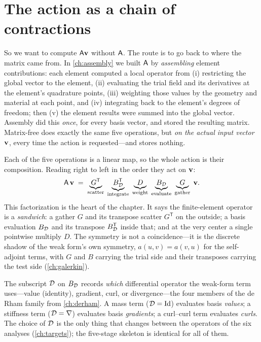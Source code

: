 \section{The action as a chain of contractions}
\label{sec:mf-chain}

So we want to compute $\mathsf{A}\mathbf{v}$ without $\mathsf{A}$. The route is to go back to
where the matrix came from. In \cref{ch:assembly} we built $\mathsf{A}$ by
\emph{assembling} element contributions: each element computed a local operator
from (i) restricting the global vector to the element, (ii) evaluating the
trial field and its derivatives at the element's quadrature points, (iii)
weighting those values by the geometry and material at each point, and (iv)
integrating back to the element's degrees of freedom; then (v) the element
results were summed into the global vector. Assembly did this \emph{once}, for
every basis vector, and stored the resulting matrix. Matrix-free does exactly the
same five operations, but \emph{on the actual input vector $\mathbf{v}$}, every time the
action is requested---and stores nothing.

Each of the five operations is a linear map, so the whole action is their
composition. Reading right to left in the order they act on $\mathbf{v}$:
\begin{equation}
  \mathsf{A}\,\mathbf{v}
   \;=\;
   \underbrace{G^{\mathsf T}}_{\text{scatter}}\;
   \underbrace{B_{\mathcal{D}}^{\mathsf T}}_{\text{integrate}}\;
   \underbrace{D}_{\text{weight}}\;
   \underbrace{B_{\mathcal{D}}}_{\text{evaluate}}\;
   \underbrace{G}_{\text{gather}}\;
   \mathbf{v} .
  \label{eq:mf-chain}
\end{equation}
This factorization is the heart of the chapter. It says the finite-element
operator is a \emph{sandwich}: a gather $G$ and its transpose scatter
$G^{\mathsf T}$ on the outside; a basis evaluation $B_{\mathcal{D}}$ and its transpose
$B_{\mathcal{D}}^{\mathsf T}$ inside that; and at the very center a single pointwise
multiply $D$. The symmetry is not a coincidence---it is the discrete shadow of
the weak form's own symmetry, $a(u,v)=a(v,u)$ for the self-adjoint terms, with
$G$ and $B$ carrying the trial side and their transposes carrying the test side
(\cref{ch:galerkin}).

\begin{notationbox}
The subscript $\mathcal{D}$ on $B_{\mathcal{D}}$ records \emph{which} differential
operator the weak-form term uses---value (identity), gradient, curl, or
divergence---the four members of the de Rham family from \cref{ch:derham}. A
mass term ($\mathcal{D} = \mathrm{Id}$) evaluates basis \emph{values}; a stiffness
term ($\mathcal{D}=\nabla$) evaluates basis \emph{gradients}; a curl--curl term
evaluates \emph{curls}. The choice of $\mathcal{D}$ is the only thing that changes
between the operators of the six analyses (\cref{ch:targets}); the five-stage
skeleton is identical for all of them.
\end{notationbox}

